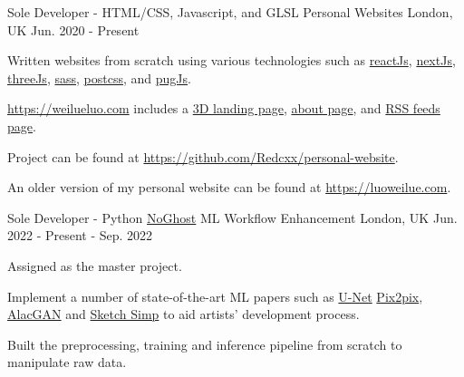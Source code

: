 

\begin{cventries}

  \cventry
    {Sole Developer - HTML/CSS, Javascript, and GLSL} %
    {Personal Websites} %
    {London, UK} %
    {Jun. 2020 - Present} %
    {
      \begin{cvitems} %
        \item {Written websites from scratch using various technologies such as \href{https://reactjs.org/}{reactJs}, \href{https://nextjs.org/}{nextJs}, \href{https://threejs.org/}{threeJs}, \href{https://sass-lang.com/}{sass},  \href{https://postcss.org/}{postcss}, and \href{https://pugjs.org/api/getting-started.html}{pugJs}.}
        \item {\href{https://weilueluo.com}{https://weilueluo.com} includes a \href{https://weilueluo.com}{3D landing page}, \href{https://weilueluo.com/about.html}{about page}, and \href{https://weilueluo.com/rss.html}{RSS feeds page}.}
        \item {Project can be found at \href{https://github.com/Redcxx/personal-website}{https://github.com/Redcxx/personal-website}.}
        \item {An older version of my personal website can be found at \href{https://luoweilue.com}{https://luoweilue.com}.}
      \end{cvitems}
    }

    \cventry
      {Sole Developer - Python} %
      {\href{https://www.noghost.co.uk/}{NoGhost} ML Workflow Enhancement} %
      {London, UK} %
      {Jun. 2022 - Present - Sep. 2022} %
      {
        \begin{cvitems} %
          \item {Assigned as the master project.}
          \item {Implement a number of state-of-the-art ML papers such as \href{https://arxiv.org/abs/1505.04597}{U-Net} \href{https://arxiv.org/pdf/1611.07004.pdf}{Pix2pix}, \href{https://arxiv.org/abs/1808.03240}{AlacGAN} and \href{https://esslab.jp/~ess/en/research/sketch/}{Sketch Simp} to aid artists' development process.}
          \item {Built the preprocessing, training and inference pipeline from scratch to manipulate raw data.}
        \end{cvitems}
      }
    

\end{cventries}

